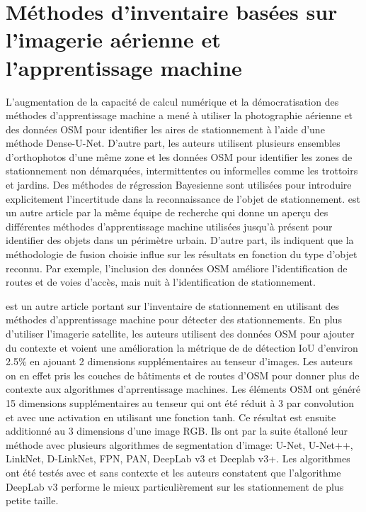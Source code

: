 \section{Méthodes d'inventaire basées sur l'imagerie aérienne et l'apprentissage machine}
  L'augmentation de la capacité de calcul numérique et la démocratisation des méthodes d'apprentissage machine a mené \textcite{Hellekes:ParkingSpace:2023} à utiliser la photographie aérienne et des données \ac{OSM} pour identifier les aires de stationnement à l'aide d'une méthode Dense-U-Net. D'autre part, les auteurs utilisent plusieurs ensembles d'orthophotos d'une même zone et les données \ac{OSM} pour identifier les zones de stationnement non démarquées, intermittentes ou informelles comme les trottoirs et jardins. Des méthodes de régression Bayesienne sont utilisées pour introduire explicitement l'incertitude dans la reconnaissance de l'objet de stationnement. \textcite{Henry:CitywideEstimation:2021} est un autre article par la même équipe de recherche qui donne un aperçu des différentes méthodes d'apprentissage machine utilisées jusqu'à présent pour identifier des objets dans un périmètre urbain. D'autre part, ils indiquent que la méthodologie de fusion choisie influe sur les résultats en fonction du type d'objet reconnu. Par exemple, l'inclusion des données \ac{OSM} améliore l'identification de routes et de voies d'accès, mais nuit à l'identification de stationnement.  \par
  \textcite{Yin:ContextenrichedSatellite:2022} est un autre article portant sur l'inventaire de stationnement en utilisant des méthodes d'apprentissage machine pour détecter des stationnements. En plus d'utiliser l'imagerie satellite, les auteurs utilisent des données \ac{OSM} pour ajouter du contexte et voient une amélioration la métrique de de détection \ac{IoU} d'environ 2.5\% en ajouant 2 dimensions supplémentaires au tenseur d'images. Les auteurs on en effet pris les couches de bâtiments et de routes d'\ac{OSM} pour donner plus de contexte aux algorithmes d'aprrentissage machines. Les éléments OSM ont généré 15 dimensions supplémentaires au tenseur qui ont été réduit à 3 par convolution et avec une activation en utilisant une fonction tanh. Ce résultat est ensuite additionné au 3 dimensions d'une image RGB. Ils ont par la suite étalloné leur méthode avec plusieurs algorithmes de segmentation d'image: U-Net, U-Net++, LinkNet, D-LinkNet, FPN, PAN, DeepLab v3 et Deeplab v3+. Les algorithmes ont été testés avec et sans contexte et les auteurs constatent que l'algorithme DeepLab v3 performe le mieux particulièrement sur les stationnement de plus petite taille.